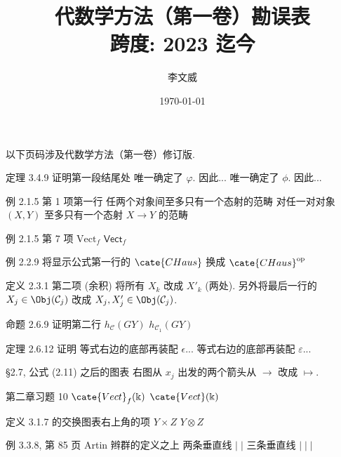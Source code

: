 \documentclass{AJerrata}
\title{\bfseries 代数学方法（第一卷）勘误表 \\ 跨度: 2023 迄今 }
\author{李文威}
\date{\today}
\begin{document}
	\maketitle
	以下页码涉及代数学方法（第一卷）修订版.

	\begin{Errata}
		\item[定理 3.4.9 证明第一段结尾处]
		\Orig 唯一确定了 $\varphi$. 因此...
		\Corr 唯一确定了 $\phi$. 因此...
		
		\item[例 2.1.5 第 1 项第一行]
		\Orig 任两个对象间至多只有一个态射的范畴
		\Corr 对任一对对象 $(X, Y)$ 至多只有一个态射 $X \to Y$ 的范畴
		
		\item[例 2.1.5 第 7 项]
		\Orig $\mathrm{Vect}_f$
		\Corr $\mathsf{Vect}_f$
		
		\item[例 2.2.9]
		将显示公式第一行的 $\cate{CHaus}$ 换成 $\cate{CHaus}^{\text{op}}$
		
		\item[定义 2.3.1 第二项 (余积)]
		将所有 $X_k$ 改成 $X'_k$ (两处). 另外将最后一行的 $X_j \in \Obj(\mathcal{C}_j)$ 改成 $X_j, X'_j \in \Obj(\mathcal{C}_j)$.
		
		\item[命题 2.6.9 证明第二行]
		\Orig $h_{\mathcal{C}}(GY)$
		\Corr $h_{\mathcal{C}_1}(GY)$
		
		\item[定理 2.6.12 证明]
		\Orig 等式右边的底部再装配 $\epsilon$...
		\Corr 等式右边的底部再装配 $\varepsilon$...
		
		\item[\S 2.7, 公式 (2.11) 之后的图表]
		右图从 $x_j$ 出发的两个箭头从 $\to$ 改成 $\mapsto$.
		
		\item[第二章习题 10]
		\Orig $\cate{Vect}_f(\Bbbk)$
		\Corr $\cate{Vect}(\Bbbk)$
		
		\item[定义 3.1.7 的交换图表右上角的项]
		\Orig $Y \times Z$
		\Corr $Y \otimes Z$
		
		\item[例 3.3.8, 第 85 页 Artin 辫群的定义之上]
		\Orig 两条垂直线 $\vert\;\vert$
		\Corr 三条垂直线 $\vert\;\vert\;\vert$
		

\end{Errata}
\end{document}
